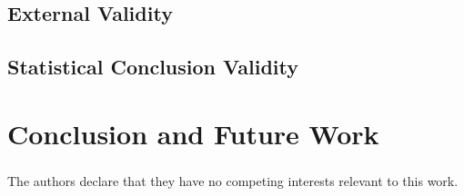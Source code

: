 \documentclass[runningheads]{llncs}
\begin{document}
\subsection{External Validity}

\subsection{Statistical Conclusion Validity}

\section{Conclusion and Future Work}

\begin{credits}
	\subsubsection{\ackname}

	\subsubsection{\discintname}
	The authors declare that they have no competing interests relevant to this work.
\end{credits}




\end{document}

